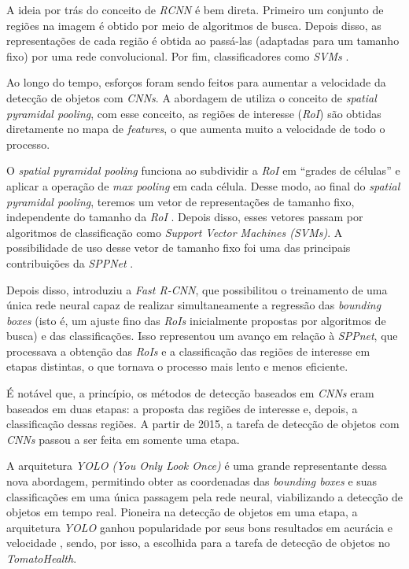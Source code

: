 A ideia por trás do conceito de \emph{RCNN} é bem direta. Primeiro um conjunto de regiões na imagem é obtido por meio de algoritmos de busca. Depois disso, as representações de cada região é obtida ao passá-las (adaptadas para um tamanho fixo) por uma rede convolucional. Por fim, classificadores como \emph{SVMs} \citep{Zou2019Object}.

Ao longo do tempo, esforços foram sendo feitos para aumentar a velocidade da detecção de objetos com \emph{CNNs}. A abordagem de \cite{SPPNet} utiliza o conceito de \emph{spatial pyramidal pooling}, com esse conceito, as regiões de interesse (\emph{RoI}) são obtidas diretamente no mapa de \emph{features}, o que aumenta muito a velocidade de todo o processo.

O \emph{spatial pyramidal pooling} funciona ao subdividir a \emph{RoI} em ``grades de células'' e aplicar a operação de \emph{max pooling} em cada célula. Desse modo, ao final do \emph{spatial pyramidal pooling}, teremos um vetor de representações de tamanho fixo, independente do tamanho da \emph{RoI} \citep{SPPNet}. Depois disso, esses vetores passam por algoritmos de classificação como \emph{Support Vector Machines (SVMs)}. A possibilidade de uso desse vetor de tamanho fixo foi uma das principais contribuições da \emph{SPPNet} \citep{Zou2019Object}.

Depois disso, \cite{fastRCNN} introduziu a \emph{Fast R-CNN}, que possibilitou o treinamento de uma única rede neural capaz de realizar simultaneamente a regressão das \emph{bounding boxes} (isto é, um ajuste fino das \emph{RoIs} inicialmente propostas por algoritmos de busca) e das classificações. Isso representou um avanço em relação à \emph{SPPnet}, que processava a obtenção das \emph{RoIs} e a classificação das regiões de interesse em etapas distintas, o que tornava o processo mais lento e menos eficiente.

É notável que, a princípio, os métodos de detecção baseados em \emph{CNNs} eram baseados em duas etapas: a proposta das regiões de interesse e, depois, a classificação dessas regiões. A partir de 2015, a tarefa de detecção de objetos com \emph{CNNs} passou a ser feita em somente uma etapa. 

A arquitetura \emph{YOLO (You Only Look Once)} é uma grande representante dessa nova abordagem, permitindo obter as coordenadas das \emph{bounding boxes} e suas classificações em uma única passagem pela rede neural, viabilizando a detecção de objetos em tempo real. Pioneira na detecção de objetos em uma etapa, a arquitetura \emph{YOLO} ganhou popularidade por seus bons resultados em acurácia e velocidade \citep{Zou2019Object}, sendo, por isso, a escolhida para a tarefa de detecção de objetos no \emph{TomatoHealth}.

